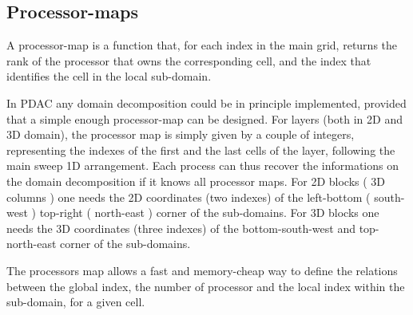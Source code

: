 \subsection{Processor-maps}
A processor-map is a function that, for each index in the main grid, returns the rank
of the processor that owns the corresponding cell, and the index that identifies the
cell in the local sub-domain.

In PDAC any domain decomposition could be in principle implemented, provided that a 
simple enough processor-map can be designed.
For layers (both in 2D and 3D domain), the processor map is simply given by a couple of integers,
representing the indexes of the first and the last cells of the layer, following
the main sweep 1D arrangement.  Each process can thus recover
the informations on the domain decomposition if it knows all processor maps.
For 2D blocks ( 3D columns ) one needs the 2D coordinates (two indexes) of the left-bottom ( south-west )
top-right ( north-east ) corner of the sub-domains.
For 3D blocks one needs the 3D coordinates (three indexes) of the bottom-south-west and
top-north-east corner of the sub-domains.

The processors map allows a fast and memory-cheap way to define the relations
between the global index, the number of processor and the local index 
within the sub-domain, for a given cell.\\
%

